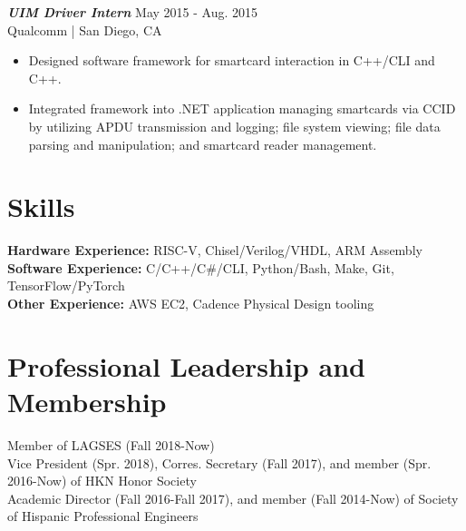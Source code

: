 \documentclass[letter]{res}
\begin{document}
\begin{resume}
{\sl \textbf{UIM Driver Intern}} \hfill May 2015 - Aug. 2015\\
Qualcomm | San Diego, CA \newline

 \vspace{-4mm}

 \begin{itemize}
 \item Designed software framework for smartcard interaction in C++/CLI and C++.
 \item Integrated framework into .NET application managing smartcards via CCID by utilizing APDU transmission and logging; file system viewing; file data parsing and manipulation; and smartcard reader management.
 \end{itemize}

\vspace{-4mm}

\section{Skills}
\textbf{Hardware Experience:} RISC-V, Chisel/Verilog/VHDL, ARM Assembly\\
\textbf{Software Experience:} C/C++/C\#/CLI, Python/Bash, Make, Git, TensorFlow/PyTorch\\
\textbf{Other Experience:} AWS EC2, Cadence Physical Design tooling\\

\vspace{-8mm}

\section{Professional Leadership and Membership}
Member of LAGSES (Fall 2018-Now)\\
Vice President (Spr. 2018), Corres. Secretary (Fall 2017), and member (Spr. 2016-Now) of HKN Honor Society\\
Academic Director (Fall 2016-Fall 2017), and member (Fall 2014-Now) of Society of Hispanic Professional Engineers\\


\end{resume}
\end{document}
